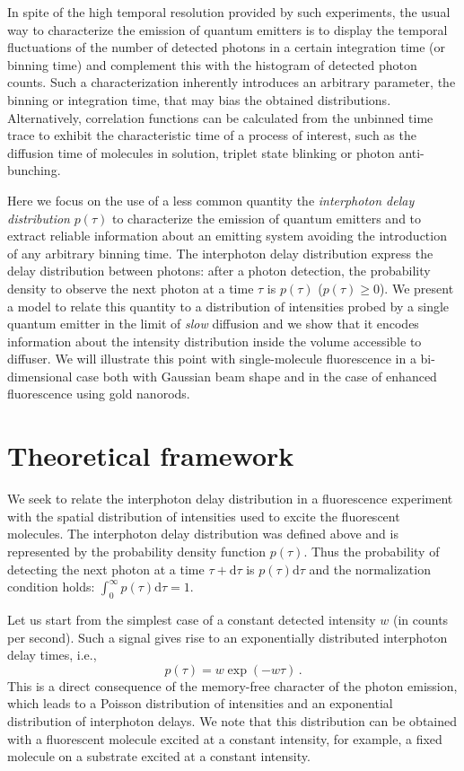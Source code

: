 In spite of the high temporal resolution provided by such experiments, 
the usual way to characterize the emission of quantum emitters is to display the temporal 
fluctuations of the number of detected photons in a certain integration time (or binning time) and
complement this with the histogram of detected photon counts. Such a characterization inherently introduces
an arbitrary parameter, the binning or integration time, that may bias the obtained distributions.\cite{Lippitz2005}
Alternatively, correlation functions can be calculated from the unbinned time trace to exhibit the characteristic 
time of a process of interest, such as the diffusion time of molecules
in solution\cite{FCS}, triplet state blinking\cite{} or photon anti-bunching.\cite{}

Here we focus on the use of a less common quantity the \textit{interphoton delay distribution} $p(\tau)$
to characterize the emission of quantum emitters and to extract reliable information about an
emitting system avoiding the introduction of any arbitrary binning time. The interphoton delay 
distribution express the delay distribution between photons: after a photon detection, the probability
density to observe the next photon at a time $\tau$ is $p(\tau)$ ($p(\tau)\geq 0$). \cite{Verberk2003}
We present a model to relate this quantity to a distribution of intensities probed by a 
single quantum emitter in the limit of \textit{slow} diffusion and we show that it encodes information about the intensity distribution inside the volume accessible to diffuser. 
We will illustrate this point with single-molecule fluorescence 
in a bi-dimensional case both with Gaussian beam shape and in the case of enhanced fluorescence using
gold nanorods.



\section{Theoretical framework}

We seek to relate the interphoton delay distribution in a fluorescence experiment with 
the spatial distribution of intensities used to excite the fluorescent molecules. The interphoton
delay distribution was defined above and is represented by the probability density function $p(\tau)$. 
Thus the probability of detecting the next photon at a time 
$\tau+\mbox{d}\tau$ is $p(\tau)\mbox{d}\tau$ and the
normalization condition holds: $\int_0^{\infty}{p(\tau)\mbox{d}\tau}=1$.

Let us start from the simplest case of a constant detected intensity $w$ (in counts per second).
Such a signal gives rise to an exponentially distributed 
interphoton delay times, i.e., 
\begin{equation}
p(\tau)=w\exp(-w\tau)\,.
\label{eq:exponential_distribution}
\end{equation}
This is a direct consequence of the memory-free character of the photon emission, which leads to a Poisson distribution
of intensities and an exponential distribution of interphoton delays. We note that this distribution can be obtained
with a fluorescent molecule excited at a constant intensity, for example, a fixed molecule on a substrate
excited at a constant intensity. 

